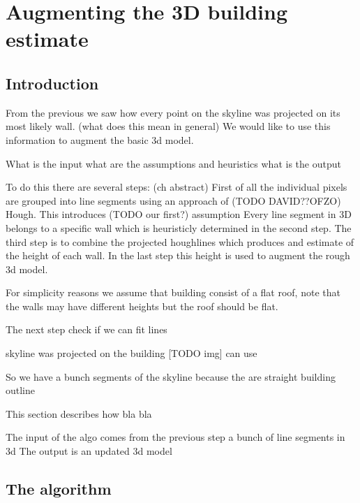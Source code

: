 
\section{Augmenting the 3D building estimate}
\subsection{Introduction}
From the previous we saw how every point on the skyline was projected on its most likely wall. (what does this mean in general)
We would like to use this information to augment the basic 3d model.

What is the input
what are the assumptions and heuristics
what is the output

To do this there are several steps:
(ch abstract)
First of all the individual pixels are grouped into line segments using an approach of (TODO DAVID??OFZO) Hough.
This introduces (TODO our first?) assumption 
Every line segment in 3D belongs to a specific wall which is heuristicly determined in the second step.
The third step is to combine the projected houghlines which produces and estimate of the height of each wall.
In the last step this height is used to augment the rough 3d model.


For simplicity reasons we assume that building consist of a flat roof, note that the walls may have different heights but the roof should be flat.



The next step 
check if we can fit lines 


skyline was projected on the building 
[TODO img]
can use 

So we have a bunch 
segments of the skyline 
because the are straight
building outline

This section describes how bla bla

The input of the algo comes from the previous step
a bunch of line segments in 3d
The output is an updated 3d model 




\subsection{The algorithm}
